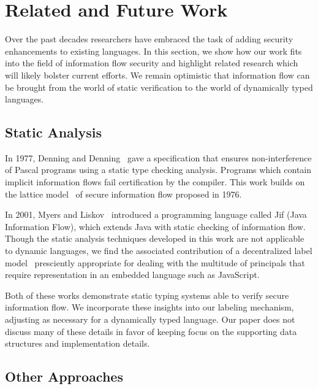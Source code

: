 \documentclass[preprint]{sigplanconf}
\begin{document}
\section{Related and Future Work}
\label{sec:relatedwork}


Over the past decades researchers have embraced the task of adding security enhancements to existing languages.
In this section, we show how our work fits into the field of information flow security and highlight related research which will likely bolster current efforts.
We remain optimistic that information flow can be brought from the world of static verification to the world of dynamically typed languages.

\subsection{Static Analysis}

In 1977, Denning and Denning~\cite{359712} gave a specification that ensures non-interference of Pascal programs using a static type checking analysis.
Programs which contain implicit information flows fail certification by the compiler.
This work builds on the lattice model~\cite{denning1976lattice} of secure information flow proposed in 1976.

In 2001, Myers and Liskov~\cite{myers2001jif} introduced a programming language called Jif (Java Information Flow), which extends Java with static checking of information flow.
Though the static analysis techniques developed in this work are not applicable to dynamic languages, we find the associated contribution of a decentralized label model~\cite{363526} presciently appropriate for dealing with the multitude of principals that require representation in an embedded language such as JavaScript.

Both of these works demonstrate static typing systems able to verify secure information flow.
We incorporate these insights into our labeling mechanism, adjusting as necessary for a dynamically typed language.
Our paper does not discuss many of these details in favor of keeping focus on the supporting data structures and implementation details.

\subsection{Other Approaches}
\end{document}
